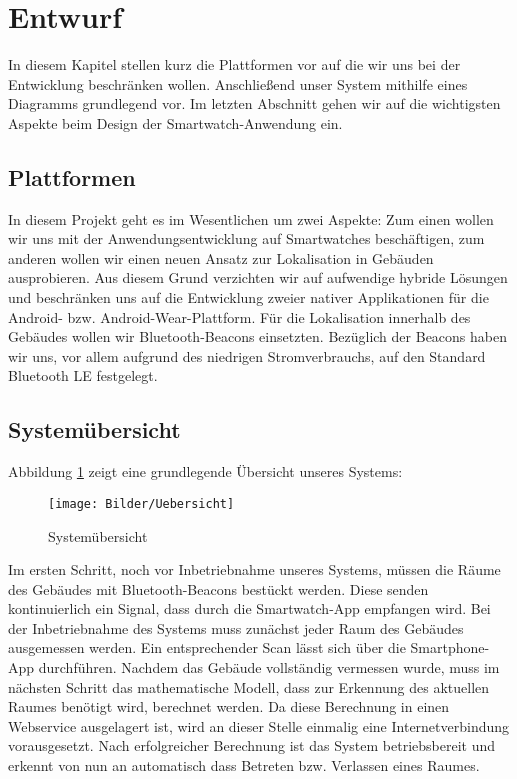 \section{Entwurf}
In diesem Kapitel stellen kurz die Plattformen vor auf die wir uns bei der Entwicklung beschränken wollen. Anschließend unser System mithilfe eines Diagramms grundlegend vor. Im letzten Abschnitt gehen wir auf die wichtigsten Aspekte beim Design der Smartwatch-Anwendung ein.

\subsection{Plattformen}
In diesem Projekt geht es im Wesentlichen um zwei Aspekte: Zum einen wollen wir uns mit der Anwendungsentwicklung auf Smartwatches beschäftigen, zum anderen wollen wir einen neuen Ansatz zur Lokalisation in Gebäuden ausprobieren. Aus diesem Grund verzichten wir auf aufwendige hybride Lösungen und beschränken uns auf die Entwicklung zweier nativer Applikationen für die Android- bzw. Android-Wear-Plattform. Für die Lokalisation innerhalb des Gebäudes wollen wir Bluetooth-Beacons einsetzten. Bezüglich der Beacons haben wir uns, vor allem aufgrund des niedrigen Stromverbrauchs, auf den Standard Bluetooth LE festgelegt.

\subsection{Systemübersicht}
Abbildung \ref{fig:Übersicht} zeigt eine grundlegende Übersicht unseres Systems:

\begin{figure}[H]
\centering
\texttt{[image: Bilder/Uebersicht]}
\caption{Systemübersicht}
\label{fig:Übersicht}
\end{figure}

Im ersten Schritt, noch vor Inbetriebnahme unseres Systems, müssen die Räume des Gebäudes mit Bluetooth-Beacons bestückt werden. Diese senden kontinuierlich ein Signal, dass durch die Smartwatch-App empfangen wird. Bei der Inbetriebnahme des Systems muss zunächst jeder Raum des Gebäudes ausgemessen werden. Ein entsprechender Scan lässt sich über die Smartphone-App durchführen. Nachdem das Gebäude vollständig vermessen wurde, muss im nächsten Schritt das mathematische Modell, dass zur Erkennung des aktuellen Raumes benötigt wird, berechnet werden. Da diese Berechnung in einen Webservice ausgelagert ist, wird an dieser Stelle einmalig eine Internetverbindung vorausgesetzt. Nach erfolgreicher Berechnung ist das System betriebsbereit und erkennt von nun an automatisch dass Betreten bzw. Verlassen eines Raumes.

